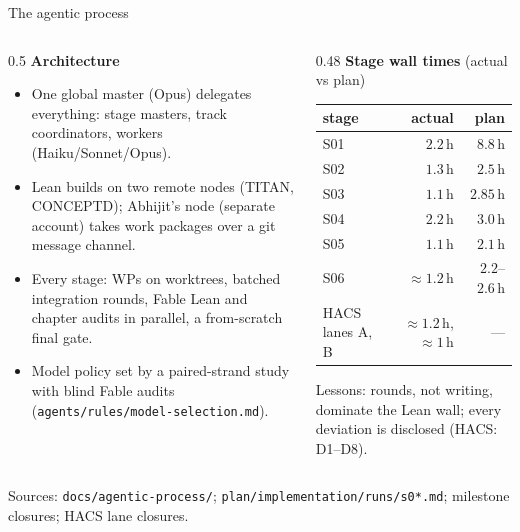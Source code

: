 \begin{frame}{The agentic process}
  \footnotesize
  \begin{columns}[T]
  \begin{column}{0.5\textwidth}
  \textbf{Architecture}
  \begin{itemize}
    \item One global master (Opus) delegates everything: stage masters, track coordinators, workers (Haiku/Sonnet/Opus).
    \item Lean builds on two remote nodes (TITAN, CONCEPTD); Abhijit's node (separate account) takes work packages over a git message channel.
    \item Every stage: WPs on worktrees, batched integration rounds, Fable Lean and chapter audits in parallel, a from-scratch final gate.
    \item Model policy set by a paired-strand study with blind Fable audits (\texttt{agents/rules/model-selection.md}).
  \end{itemize}
  \end{column}
  \begin{column}{0.48\textwidth}
  \textbf{Stage wall times} (actual vs plan)\\[2pt]
  {\scriptsize\begin{tabular}{@{}lrr@{}}\toprule
    stage & actual & plan\\\midrule
    S01 & $2.2$\,h & $8.8$\,h\\
    S02 & $1.3$\,h & $2.5$\,h\\
    S03 & $1.1$\,h & $2.85$\,h\\
    S04 & $2.2$\,h & $3.0$\,h\\
    S05 & $1.1$\,h & $2.1$\,h\\
    S06 & $\approx1.2$\,h & $2.2$--$2.6$\,h\\
    HACS lanes A, B & $\approx1.2$\,h, $\approx1$\,h & ---\\\bottomrule
  \end{tabular}}

  \smallskip
  Lessons: rounds, not writing, dominate the Lean wall; every deviation is disclosed (HACS: D1--D8).
  \end{column}
  \end{columns}
  \vfill
  {\tiny Sources: \texttt{docs/agentic-process/}; \texttt{plan/implementation/runs/s0*.md}; milestone closures; HACS lane closures.}
\end{frame}
